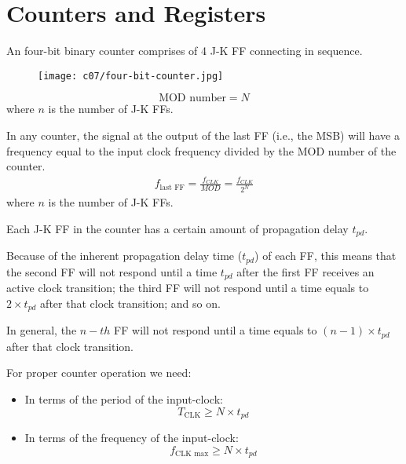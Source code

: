 \chapter{Counters and Registers}

    \par An four-bit binary counter comprises of 4 J-K FF connecting in sequence.
    \par {}
    \begin{figure}[H]
      \centering
      \texttt{[image: c07/four-bit-counter.jpg]}
    \end{figure}

    \begin{equation*}
      \mbox{MOD number} = N
    \end{equation*}
    where $n$ is the number of J-K FFs.

    \par In any counter, the signal at the output of the last FF (i.e., the
    MSB) will have a frequency equal to the input clock frequency
    divided by the MOD number of the counter.
    \begin{align*}
      f_{\mbox{last FF}} = \frac{f_{CLK}}{MOD} = \frac{f_{CLK}}{2^{N}}
    \end{align*}
    where $n$ is the number of J-K FFs.


    \par Each J-K FF in the counter has a certain amount of propagation delay
    $t_{pd}$.
    \par Because of the inherent propagation delay time ($t_{pd}$) of each
      FF, this means that the second FF will not respond until a time $t_{pd}$
      after the first FF receives an active clock transition; the third FF
      will not respond until a time equals to $2 \times t_{pd}$ after that
      clock transition; and so on.
    \par In general, the $n-th$ FF will not respond until a time equals to
    $(n - 1) \times t_{pd}$ after that clock transition.
    \par For proper counter operation we need:
    \begin{itemize}
      \item In terms of the period of the input-clock:
      \begin{equation*}
        T_{\mbox{CLK}} \geq N \times t_{pd}
      \end{equation*}
      \item In terms of the frequency of the input-clock:
      \begin{equation*}
        f_{\mbox{CLK max}} \geq N \times t_{pd}
      \end{equation*}
    \end{itemize}


